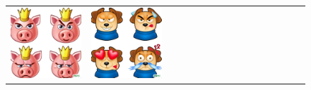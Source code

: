 \begin{figure}[ht!]
\begin{adjustwidth}{-0.8in}{-0.5in}
\begin{tabular}{cccccccccccccccccccc}
\multicolumn{3}{c}{\includegraphics[width=\twobytwocolwidth\textwidth]{figures/cherries/emoji_pig.jpg}} &
\multicolumn{3}{c}{\includegraphics[width=\twobytwocolwidth\textwidth]{figures/cherries/emoji_dog.jpg}} &&

\end{tabular}
\end{adjustwidth}
\end{figure}
